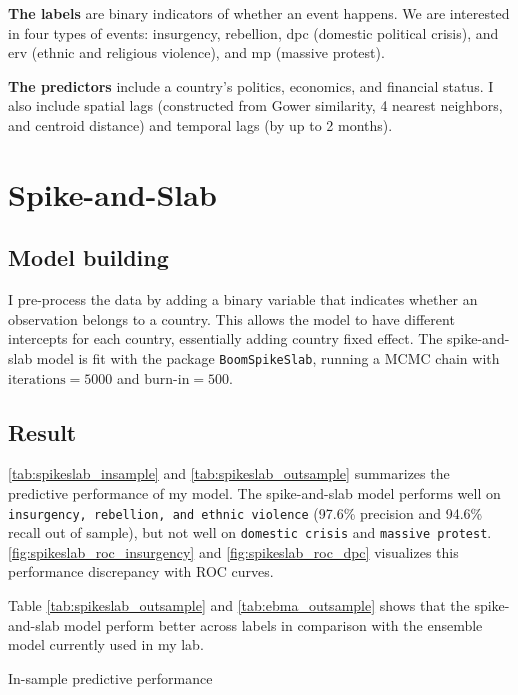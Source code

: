 \documentclass{article}
\begin{document}
\textbf{The labels} are binary indicators of whether an event happens. We are interested in four types of events: insurgency, rebellion, dpc (domestic political crisis), and erv (ethnic and religious violence), and mp (massive protest).

\textbf{The predictors} include a country's politics, economics, and financial status. I also include spatial lags (constructed from Gower similarity, 4 nearest neighbors, and centroid distance) and temporal lags (by up to 2 months).

\section{Spike-and-Slab}

\subsection{Model building}
I pre-process the data by adding a binary variable that indicates whether an observation belongs to a country. This allows the model to have different intercepts for each country, essentially adding country fixed effect. The spike-and-slab model is fit with the package \verb|BoomSpikeSlab|, running a MCMC chain with $\text{iterations}=5000$ and $\text{burn-in}=500$. 

\subsection{Result}

\autoref{tab:spikeslab_insample} and \autoref{tab:spikeslab_outsample} summarizes the predictive performance of my model. The spike-and-slab model performs well on \verb|insurgency, rebellion, and ethnic violence| (97.6\% precision and 94.6\% recall out of sample), but not well on \verb|domestic crisis| and \verb|massive protest|. \autoref{fig:spikeslab_roc_insurgency} and \autoref{fig:spikeslab_roc_dpc} visualizes this performance discrepancy with ROC curves.

Table \autoref{tab:spikeslab_outsample} and \autoref{tab:ebma_outsample} shows that the spike-and-slab model perform better across labels in comparison with the ensemble model currently used in my lab.

\begin{table}[H]
\centering

\caption{In-sample predictive performance}
\label{tab:spikeslab_insample}
\end{table}
\end{document}
